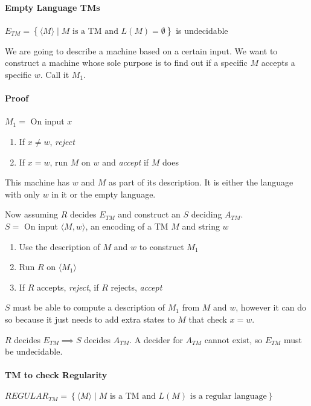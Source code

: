 \documentclass[12 pt]{article}
\begin{document}
\paragraph{Empty Language TMs}
$E_{TM} = \left\{\langle M \rangle \mid M \text{ is a TM and } L(M) =
  \emptyset\right\}$ is undecidable

We are going to describe a machine based on a certain input. We want
to construct a machine whose sole purpose is to find out if a specific
$M$ accepts a specific $w$. Call it $M_1$.
\paragraph{Proof}
$M_1 = $ On input $x$
\begin{enumerate}
\item If $x \neq w$, \textit{reject}
\item If $x=w$, run $M$ on $w$ and \textit{accept} if $M$ does
\end{enumerate}
This machine has $w$ and $M$ as part of its description. It is either the
language with only $w$ in it or the empty language.

Now assuming $R$ decides $E_{TM}$ and construct an $S$ deciding
$A_{TM}$.
\\ $S = $ On input $\langle M,w \rangle$, an encoding of a TM $M$ and
string $w$
\begin{enumerate}
\item Use the description of $M$ and $w$ to construct $M_1$
\item Run $R$ on $\langle M_1 \rangle$
\item If $R$ accepts, \textit{reject}, if $R$ rejects, \textit{accept}
\end{enumerate}
$S$ must be able to compute a description of $M_1$ from $M$ and $w$,
however it can do so because it just needs to add extra states to $M$
that check $x=w$.

$R$ decides $E_{TM} \implies S$ decides $A_{TM}$. A decider for
$A_{TM}$ cannot exist, so $E_{TM}$ must be undecidable.
\paragraph{TM to check Regularity}
$REGULAR_{TM} = \left\{\langle M \rangle \mid M \text{ is a TM and
  }L(M) \text{ is a regular language}\right\}$
\end{document}
